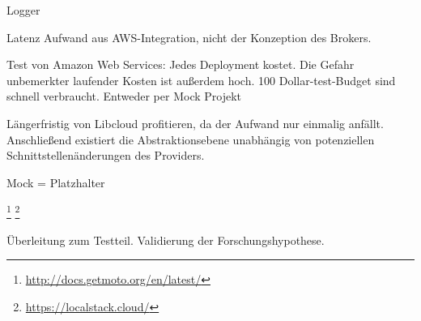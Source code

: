 Logger





Latenz
Aufwand aus AWS-Integration, nicht der Konzeption des Brokers.

Test von Amazon Web Services: Jedes Deployment kostet. Die Gefahr unbemerkter laufender Kosten ist außerdem hoch. 100 Dollar-test-Budget sind schnell verbraucht. Entweder per Mock Projekt

Längerfristig von Libcloud profitieren, da der Aufwand nur einmalig anfällt. Anschließend existiert die Abstraktionsebene unabhängig von potenziellen Schnittstellenänderungen des Providers.

Mock = Platzhalter

\footnote{\url{http://docs.getmoto.org/en/latest/}}
\footnote{\url{https://localstack.cloud/}}

%

Überleitung zum Testteil. Validierung der Forschungshypothese.